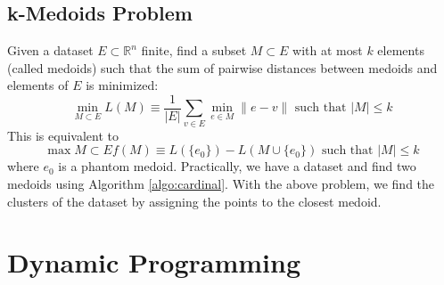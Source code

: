 \documentclass[12pt, openany]{report}
\newcommand{\R}{\mathbb{R}}
\theoremstyle{definition}
\begin{document}
\section{k-Medoids Problem}
Given a dataset $E\subset \R^n$ finite, find a subset $M\subset E$ with at most $k$ elements (called medoids) such that the sum of pairwise distances between medoids and elements of $E$ is minimized:
\begin{equation}
    \min_{M\subset E} L(M)\equiv \frac{1}{|E|}\sum_{v\in E} \min_{e\in M}\lVert e-v\rVert \text{    such that    } |M|\le k
\end{equation}
This is equivalent to 
\begin{equation}
    \max{M\subset E} f(M)\equiv L(\{e_0\})-L(M\cup \{e_0\})\text{    such that    } |M|\le k
\end{equation}
where $e_0$ is a phantom medoid. Practically, we have a dataset and find two medoids using Algorithm \ref{algo:cardinal}. With the above problem, we find the clusters of the dataset by assigning the points to the closest medoid. 
\chapter{Dynamic Programming}
\end{document}
